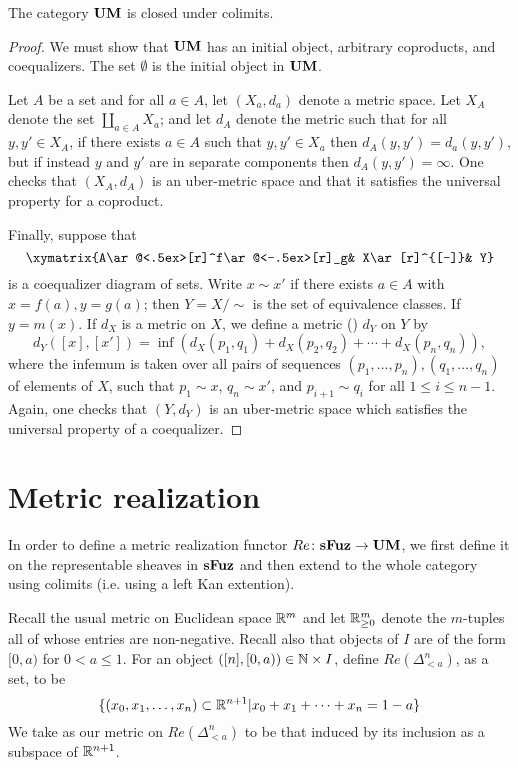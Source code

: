 \documentclass{amsart}
\def\UM{{\bf UM}}
\def\sFuz{{\bf sFuz}}
\begin{document}
\begin{lemma}

The category $\UM$ is closed under colimits.

\end{lemma}

\begin{proof}

We must show that $\UM$ has an initial object, arbitrary coproducts, and coequalizers.  The set $\emptyset$ is the initial object in $\UM$.  

Let $A$ be a set and for all $a\in A$, let $(X_a,d_a)$ denote a metric space.  Let $X_A$ denote the set $\coprod_{a\in A}X_a$; and let $d_A$ denote the metric such that for all $y,y'\in X_A$, if there exists $a\in A$ such that $y,y'\in X_a$ then $d_A(y,y')=d_a(y,y')$, but if instead $y$ and $y'$ are in separate components then $d_A(y,y')=\infty$.  One checks that $(X_A,d_A)$ is an uber-metric space and that it satisfies the universal property for a coproduct.

Finally, suppose that $$\xymatrix{A\ar@<.5ex>[r]^f\ar@<-.5ex>[r]_g& X\ar[r]^{[-]}& Y}$$ is a coequalizer diagram of sets.  Write $x\sim x'$ if there exists $a\in A$ with $x=f(a), y=g(a)$; then $Y=X/\sim$ is the set of equivalence classes.  If $y=m(x)$.   If $d_X$ is a metric on $X$, we define a metric (\cite{Wik}) $d_Y$ on $Y$ by $$d_Y([x],[x'])=\inf(d_X(p_1,q_1)+d_X(p_2,q_2)+\cdots+d_X(p_n,q_n)),$$ where the infemum is taken over all pairs of sequences $(p_1,\ldots,p_n), (q_1,\ldots,q_n)$ of elements of $X$, such that $p_1\sim x$, $q_n\sim x'$, and $p_{i+1}\sim q_i$ for all $1\leq i\leq n-1$.  Again, one checks that $(Y,d_Y)$ is an uber-metric space which satisfies the universal property of a coequalizer.

\end{proof}

\section{Metric realization}

In order to define a metric realization functor $Re\taking\sFuz\to\UM$, we first define it on the representable sheaves in $\sFuz$ and then extend to the whole category using colimits (i.e. using a left Kan extention).  

Recall the usual metric on Euclidean space ${\mathbb R}^m$ and let ${\mathbb R}^m_{\geq 0}$ denote the $m$-tuples all of whose entries are non-negative.  Recall also that objects of $I$ are of the form $[0,a)$ for $0<a\leq 1$.  For an object $([n],[0,a))\in {\mathbb N}\times I$, define $Re(\Delta^n_{<a})$, as a set, to be $$\{(x_0,x_1,\ldots,x_n)\subset{\mathbb R}^{n+1}|x_0+x_1+\cdots+x_n=1-a\}$$  We take as our metric on $Re(\Delta^n_{<a})$ to be that induced by its inclusion as a subspace of ${\mathbb R}^{n+1}$. 
\end{document}
